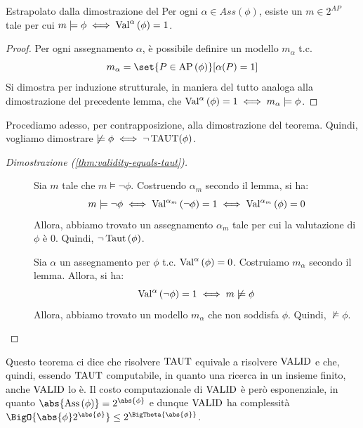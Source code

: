 \begin{lemma}[listtitle={Estrapolato dalla dimostrazione del \Cref{thm:validity-equals-taut}}]{\infosymbol{} Estrapolato dalla dimostrazione del }
  Per ogni \(\alpha \in Ass(\phi)\), esiste un \(m \in 2^{AP}\) tale per cui \(m \models \phi \iff \Val{\alpha}[\phi]=1\).
\end{lemma}

\begin{proof}
  Per ogni assegnamento \(\alpha\), è possibile definire un modello \(m_{\alpha}\) t.c.
  \[m_\alpha = \set{P \in \AP[\phi]}[\alpha(P) = 1]\]
  Si dimostra per induzione strutturale, in maniera del tutto analoga alla dimostrazione del precedente lemma, che \(\Val{\alpha}[\phi] = 1 \iff m_\alpha \models \phi\).
\end{proof}

Procediamo adesso, per contrapposizione, alla dimostrazione del teorema. Quindi, vogliamo dimostrare \(\not\models \phi \iff \neg \Taut(\phi)\).
\begin{proof}[Dimostrazione (\ref{thm:validity-equals-taut})]
  \begin{description}
    \item[\qi{\(\implies\)}]
      Sia \(m\) tale che \(m \models \neg \phi\).
      Costruendo \(\alpha_{m}\) secondo il lemma, si ha:
      \[m\models \neg \phi \iff \Val{\alpha_{m}}[\neg\phi]=1 \iff \Val{\alpha_{m}}[\phi]=0\]
      Allora, abbiamo trovato un assegnamento \(\alpha_{m}\) tale per cui la valutazione di \(\phi\) è \(0\). Quindi, \(\neg\Taut[\phi]\).
    \item[\qi{\(\impliedby\)}]
      Sia \(\alpha\) un assegnamento per \(\phi\) t.c. \(\Val{\alpha}[\phi]=0\).
      Costruiamo \(m_{\alpha}\) secondo il lemma.
      Allora, si ha:
      \[\Val{\alpha}[\neg\phi]=1 \iff m \not\models \phi\]
      Allora, abbiamo trovato un modello \(m_{\alpha}\) che non soddisfa \(\phi\). Quindi, \(\not\models \phi\).
  \end{description}
\end{proof}

Questo teorema ci dice che risolvere \(\Taut\) equivale a risolvere \(\Valid\) e che, quindi, essendo \(\Taut\) computabile, in quanto una ricerca in un insieme finito, anche \(\Valid\) lo è.
Il costo computazionale di \(\Valid\) è però esponenziale, in quanto \(\abs{\Ass{\phi}} = 2^{\abs{\phi}}\) e dunque \(\Valid\) ha complessità \(\BigO{\abs{\phi}2^{\abs{\phi}}}\leq 2^{\BigTheta{\abs{\phi}}}\).

